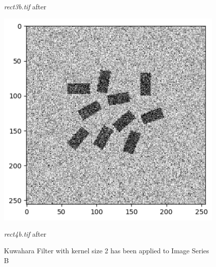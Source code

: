 \documentclass[runningheads]{llncs}
\begin{document}
\begin{figure}[h!]
\begin{minipage}[h]{0.47\linewidth}
\begin{center}
\caption{\emph{rect3b.tif} after}
\label{kb3-Kuwahara and Kernel 2}
\end{center}
\end{minipage}
\hfill
\begin{minipage}[h]{0.47\linewidth}
\begin{center}
\includegraphics[width=1\linewidth]{Report/Result_Images/image_kb4.png} 
\caption{\emph{rect4b.tif} after}
\label{kb4-Kuwahara and Kernel 2}
\end{center}
\end{minipage}
\caption*{Kuwahara Filter with kernel size 2 has been applied to Image Series B}
\label{kb1-4 Kuwahara2}
\end{figure}
 
\end{document}

